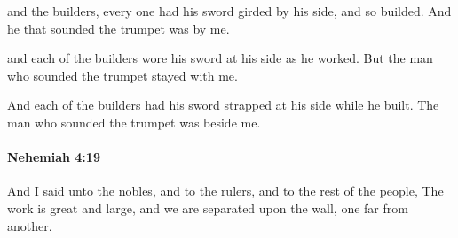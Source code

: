 			\begin{versebox}
					\item[BHS] 
					\item[LXX] 
					\item[ASV] and the builders, every one had his sword girded by his side, and so builded. And he that sounded the trumpet was by me.
					\item[NIV] and each of the builders wore his sword at his side as he worked. But the man who sounded the trumpet stayed with me.
					\item[NRSV] And each of the builders had his sword strapped at his side while he built. The man who sounded the trumpet was beside me.
			\end{versebox}

		\paragraph{Nehemiah 4:19} %
			\label{NEHEMIAH-4-19}

			And I said unto the nobles, and to the rulers, and to the rest of the people, The work is great and large, and we are separated upon the wall, one far from another.

